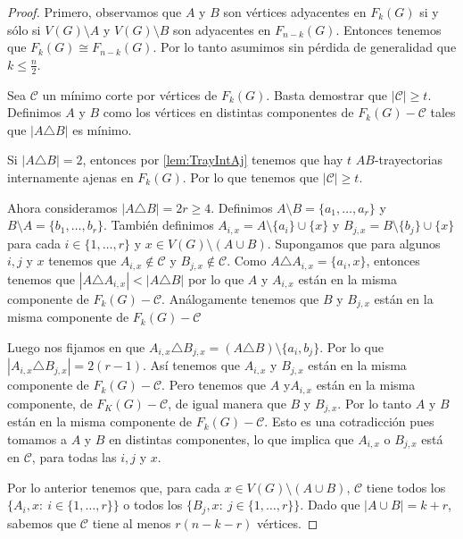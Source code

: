 \begin{proof}
Primero, observamos que $A$ y $B$ son v\'ertices adyacentes en $F_k(G)$ si y
s\'olo si $V(G) \setminus A$ y $V(G)\setminus B$ son adyacentes en $F_{n-k}(G)$.
Entonces tenemos que $F_k(G) \cong F_{n-k}(G)$. Por lo tanto asumimos sin
p\'erdida de generalidad que $k \leq \frac{n}{2}$.

Sea $\mathcal{C}$ un m\'inimo corte por v\'ertices de $F_k(G)$. Basta
demostrar que $|\mathcal{C}| \geq t$. Definimos $A$ y $B$ como los v\'ertices en
distintas componentes de $F_k(G)- \mathcal{C}$ tales que $|A \triangle B|$ es
m\'inimo.

Si $|A \triangle B| = 2$, entonces por \cref{lem:TrayIntAj}
tenemos que hay $t$ $AB$-trayectorias internamente ajenas en $F_k(G)$. Por lo
que tenemos que $|\mathcal{C}| \geq t$.

Ahora consideramos $|A \triangle B| = 2r \geq 4$. Definimos $A \setminus B
=\{a_1, \dots, a_r\}$ y $B \setminus A =\{b_1, \dots, b_r\}$. Tambi\'en
definimos $A_{i,x} = A\setminus \{a_i\} \cup \{x\}$ y $B_{j,x} = B\setminus
\{b_j\} \cup \{x\}$ para cada $i \in \{1, \dots, r\}$ y $x \in V(G)\setminus
(A\cup B)$. Supongamos que para algunos $i, j$ y $x$ tenemos que $A_{i,x} \notin
\mathcal{C}$ y $B_{j,x} \notin \mathcal{C}$. Como $A \triangle A_{i,x} = \{a_i,
x\}$, entonces tenemos que $|A \triangle A_{i,x}|< |A \triangle B|$ por lo que
$A$ y $A_{i,x}$ est\'an en la misma componente de $F_k(G)- \mathcal{C}$.
An\'alogamente tenemos que  $B$ y $B_{j,x}$ est\'an en la misma componente de
$F_k(G)-\mathcal{C}$

Luego nos fijamos en que $A_{i,x} \triangle B_{j,x} = (A \triangle B) \setminus
\{a_i, b_j\}$. Por lo que $|A_{i,x} \triangle B_{j,x}| = 2(r-1)$. As\'i
tenemos que $A_{i,x}$ y $B_{j,x}$ est\'an en la misma componente de $F_k(G)-
\mathcal{C}$. Pero tenemos que $A$ y$A_{i,x}$ est\'an en la misma componente, de
$F_K(G) - \mathcal{C}$, de igual manera que $B$ y $B_{j,x}$. Por lo tanto $A$ y
$B$ est\'an en la misma componente de $F_k(G)- \mathcal{C}$. Esto es una
cotradicci\'on pues tomamos a $A$ y $B$ en distintas componentes, lo que implica
que $A_{i,x}$ o $B_{j,x}$ est\'a en $\mathcal{C}$, para todas las $i,j$ y $x$.

Por lo anterior tenemos que, para cada $x \in V(G)\setminus (A \cup B)$,
$\mathcal{C}$ tiene todos los $\{A_i,x \colon\  i \in \{1, \dots, r\}\}$ o todos los
$\{B_j,x \colon\ j \in \{1, \dots, r\}\}$. Dado que $|A\cup B|=k +r$, sabemos que
$\mathcal{C}$ tiene al menos $r(n-k-r)$ v\'ertices.


\end{proof}
